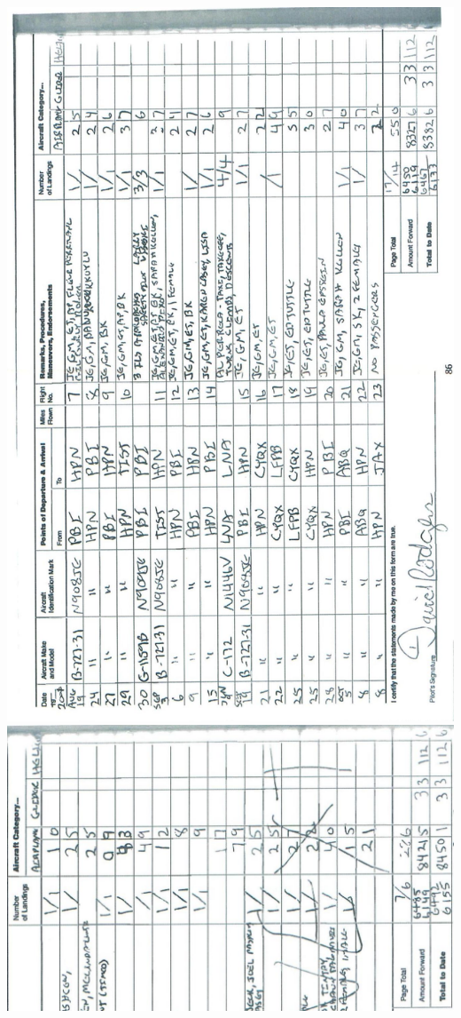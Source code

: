 \documentclass[10pt]{article}
\begin{document}
\includegraphics[max width=\textwidth, center]{2025_02_27_dd68c3d38de88f0516d9g-090}\\
\includegraphics[max width=\textwidth, center]{2025_02_27_dd68c3d38de88f0516d9g-092(2)}
\end{document}
